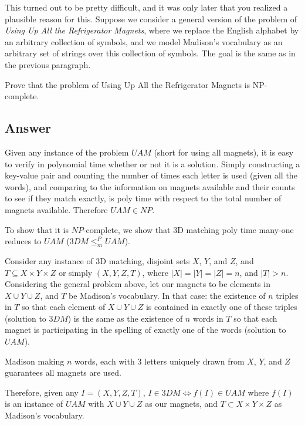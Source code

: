 \documentclass[12pt, letterpaper]{article}
\begin{document}
This turned out to be pretty difficult, and it was only later that you realized a plausible reason for this. 
Suppose we consider a general version of the problem of \textit{Using Up All the Refrigerator Magnets}, where we replace the English alphabet by an arbitrary collection of symbols, and we model Madison's vocabulary as an arbitrary set of strings over this collection of symbols. 
The goal is the same as in the previous paragraph.

Prove that the problem of Using Up All the Refrigerator Magnets is NP-complete.

\subsection*{Answer}
Given any instance of the problem $UAM$ (short for using all magnets), it is easy to verify in polynomial time whether or not it is a solution.
Simply constructing a key-value pair and counting the number of times each letter is used (given all the words), and comparing to the information on magnets available and their counts to see if they match exactly, is poly time with respect to the total number of magnets available.
Therefore $UAM \in NP$.

To show that it is $NP$-complete, we show that 3D matching poly time many-one reduces to $UAM$ ($3DM \leq_{m}^{P} UAM$).

Consider any instance of 3D matching, disjoint sets $X$, $Y$, and $Z$, and $T \subseteq X \times Y \times Z$ or simply $(X, Y, Z, T)$, where $|X| = |Y| = |Z| = n$, and $|T| > n$.
Considering the general problem above, let our magnets to be elements in $X \cup Y \cup Z$, and $T$ be Madison's vocabulary. In that case:
the existence of $n$ triples in $T$ so that each element of $X \cup Y \cup Z$ is contained in exactly one of these triples (solution to $3DM$) is the same as
the existence of $n$ words in $T$ so that each magnet is participating in the spelling of exactly one of the words (solution to $UAM$).

Madison making $n$ words, each with 3 letters uniquely drawn from  $X$, $Y$, and $Z$ guarantees all magnets are used.
 
Therefore, given any $I=(X, Y, Z, T)$, $I \in 3DM \Longleftrightarrow f(I) \in UAM$
where $f(I)$ is an instance of $UAM$ with $X \cup Y \cup Z$ as our magnets, and $T \subset X \times Y \times Z$ as Madison's vocabulary.





\end{document}
